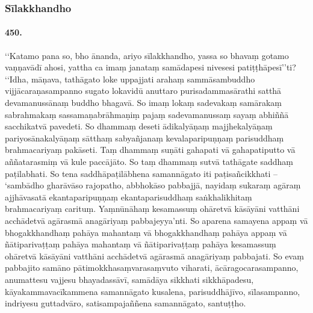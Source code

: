 \subsubsection{Sīlakkhandho}

\paragraph{450.} ‘‘Katamo pana so, bho ānanda, ariyo sīlakkhandho, yassa so bhavaṃ gotamo vaṇṇavādī ahosi, yattha ca imaṃ janataṃ samādapesi nivesesi patiṭṭhāpesī’’ti? ‘‘Idha, māṇava, tathāgato loke uppajjati arahaṃ sammāsambuddho vijjācaraṇasampanno sugato lokavidū anuttaro purisadammasārathi satthā devamanussānaṃ buddho bhagavā. So imaṃ lokaṃ sadevakaṃ samārakaṃ sabrahmakaṃ sassamaṇabrāhmaṇiṃ pajaṃ sadevamanussaṃ sayaṃ abhiññā sacchikatvā pavedeti. So dhammaṃ deseti ādikalyāṇaṃ majjhekalyāṇaṃ pariyosānakalyāṇaṃ sātthaṃ sabyañjanaṃ kevalaparipuṇṇaṃ parisuddhaṃ brahmacariyaṃ pakāseti. Taṃ dhammaṃ suṇāti gahapati vā gahapatiputto vā aññatarasmiṃ vā kule paccājāto. So taṃ dhammaṃ sutvā tathāgate saddhaṃ paṭilabhati. So tena saddhāpaṭilābhena samannāgato iti paṭisañcikkhati – ‘sambādho gharāvāso rajopatho, abbhokāso pabbajjā, nayidaṃ sukaraṃ agāraṃ ajjhāvasatā ekantaparipuṇṇaṃ ekantaparisuddhaṃ saṅkhalikhitaṃ brahmacariyaṃ carituṃ. Yaṃnūnāhaṃ kesamassuṃ ohāretvā kāsāyāni vatthāni acchādetvā agārasmā anagāriyaṃ pabbajeyya’nti. So aparena samayena appaṃ vā bhogakkhandhaṃ pahāya mahantaṃ vā bhogakkhandhaṃ pahāya appaṃ vā ñātiparivaṭṭaṃ pahāya mahantaṃ vā ñātiparivaṭṭaṃ pahāya kesamassuṃ ohāretvā kāsāyāni vatthāni acchādetvā agārasmā anagāriyaṃ pabbajati. So evaṃ pabbajito samāno pātimokkhasaṃvarasaṃvuto viharati, ācāragocarasampanno, anumattesu vajjesu bhayadassāvī, samādāya sikkhati sikkhāpadesu, kāyakammavacīkammena samannāgato kusalena, parisuddhājīvo, sīlasampanno, indriyesu guttadvāro, satisampajaññena samannāgato, santuṭṭho.

